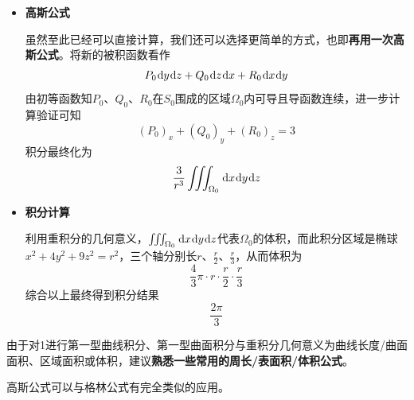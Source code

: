 \documentclass[a4paper,UTF8,fontset=windows,AutoFakeBold]{ctexart}
\newcommand*{\dr}{\hspace{0.07em}\mathrm{d}}
\newcommand*{\note}{\noindent *}
\theoremstyle{ex}
\begin{document}
\begin{framed}
{\begin{itemize}
        \item \textbf{高斯公式}
        
        虽然至此已经可以直接计算，我们还可以选择更简单的方式，也即\textbf{再用一次高斯公式}。将新的被积函数看作
        $$P_0\dr y\dr z+Q_0\dr z\dr x+R_0\dr x\dr y$$
        由初等函数知$P_0$、$Q_0$、$R_0$在$S_0$围成的区域$\Omega_0$内可导且导函数连续，进一步计算验证可知
        $$(P_0)_x+(Q_0)_y+(R_0)_z=3$$
        积分最终化为
        $$\frac{3}{r^3}\iiint_{\Omega_0}\dr x\dr y\dr z$$

        \item \textbf{积分计算}

        利用重积分的几何意义，$\iiint_{\Omega_0}\dr x\dr y\dr z$代表$\Omega_0$的体积，而此积分区域是椭球$x^2+4y^2+9z^2=r^2$，三个轴分别长$r$、$\frac{r}{2}$、$\frac{r}{3}$，从而体积为
        $$\frac{4}{3}\pi\cdot r\cdot\frac{r}{2}\cdot\frac{r}{3}$$
        综合以上最终得到积分结果
        $$\frac{2\pi}{3}$$
    \end{itemize}
}
\end{framed}

\note 由于对1进行第一型曲线积分、第一型曲面积分与重积分几何意义为曲线长度/曲面面积、区域面积或体积，建议\textbf{熟悉一些常用的周长/表面积/体积公式}。

\note 高斯公式可以与格林公式有完全类似的应用。
\end{document}
